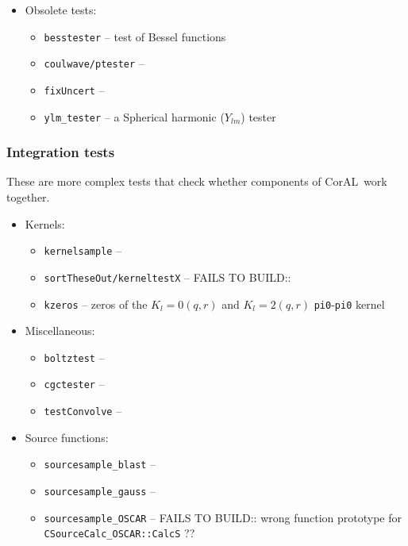 \documentclass[10pt]{article}
\newcommand{\coral}{CorAL}
\begin{document}
\begin{itemize}
    \item Obsolete tests:
    
    	\begin{itemize}
            \item \texttt{besstester} -- test of Bessel functions
            \item \texttt{coulwave/ptester} -- 
            \item \texttt{fixUncert} -- 
            \item \texttt{ylm\_tester} -- a Spherical harmonic ($Y_{lm}$) tester
    	\end{itemize}
    
\end{itemize}

\subsubsection{Integration tests}
These are more complex tests that check whether components of \coral\ work together.

\begin{itemize}
    
    \item Kernels:
    
    	\begin{itemize}
            \item \texttt{kernelsample} -- 
            \item \texttt{sortTheseOut/kerneltestX} -- FAILS TO BUILD::
            \item \texttt{kzeros} -- zeros of the $K_l=0(q,r)$ and $K_l=2(q,r)$ \texttt{pi0}-\texttt{pi0} kernel
    	\end{itemize}
	
    
    \item Miscellaneous:
    
    	\begin{itemize}
        	\item \texttt{boltztest} -- 
        	\item \texttt{cgctester} -- 
        	\item \texttt{testConvolve} -- 
    	\end{itemize}
    
    
    \item Source functions:
    
    	\begin{itemize}
        	\item \texttt{sourcesample\_blast} --
        	\item \texttt{sourcesample\_gauss} --
        	\item \texttt{sourcesample\_OSCAR} -- FAILS TO BUILD:: wrong function prototype for \texttt{CSourceCalc\_OSCAR::CalcS} ??
    	\end{itemize}

\end{itemize}
    
\end{document}
